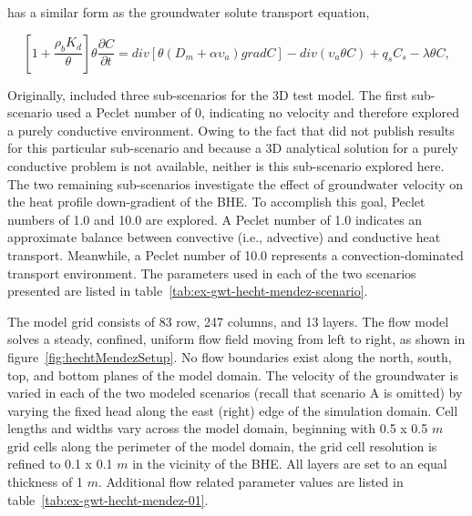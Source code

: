 has a similar form as the groundwater solute transport equation,

\begin{equation}
	\left[ 1 + \frac{\rho_b K_d}{\theta} \right] \theta \frac{\partial  C}{\partial t} = div \left[ \theta \left( D_m + \alpha \upsilon_a \right) grad C \right] - div \left( \upsilon_a \theta C \right) + q_s C_s - \lambda \theta C,
	\label{eq:hm2}
\end{equation}

Originally, \cite{hechtMendez2010} included three sub-scenarios for the 3D test model.  The first sub-scenario used a Peclet number of 0, indicating no velocity and therefore explored a purely conductive environment.  Owing to the fact that \citep{hechtMendez2010} did not publish results for this particular sub-scenario and because a 3D analytical solution for a purely conductive problem is not available, neither is this sub-scenario explored here.  The two remaining sub-scenarios investigate the effect of groundwater velocity on the heat profile down-gradient of the BHE.  To accomplish this goal, Peclet numbers of 1.0 and 10.0 are explored. A Peclet number of 1.0 indicates an approximate balance between convective (i.e., advective) and conductive heat transport.  Meanwhile, a Peclet number of 10.0 represents a convection-dominated transport environment.  The parameters used in each of the two scenarios presented are listed in table~\ref{tab:ex-gwt-hecht-mendez-scenario}.



The model grid consists of 83 row, 247 columns, and 13 layers.  The flow model solves a steady, confined, uniform flow field moving from left to right, as shown in figure~\ref{fig:hechtMendezSetup}. No flow boundaries exist along the north, south, top, and bottom planes of the model domain.  The velocity of the groundwater is varied in each of the two modeled scenarios (recall that scenario A is omitted) by varying the fixed head along the east (right) edge of the simulation domain.  Cell lengths and widths vary across the model domain, beginning with 0.5 x 0.5 $m$ grid cells along the perimeter of the model domain, the grid cell resolution is refined to 0.1 x 0.1 $m$ in the vicinity of the BHE.  All layers are set to an equal thickness of 1 $m$.  Additional flow related parameter values are listed in table~\ref{tab:ex-gwt-hecht-mendez-01}.



